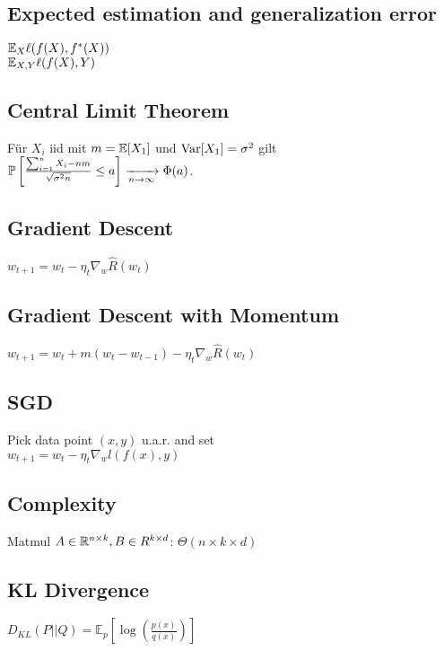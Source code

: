 \subsection*{Expected estimation and generalization error}
$\E_{X}\ell(f(X), f^\ast(X))$ \\ 
$\E_{X,Y}\ell(f(X), Y)$

\subsection*{Central Limit Theorem}

Für $X_i$ iid mit $m = \E[X_1]$ und $\Var[X_1] = \sigma^2$ gilt $\P\left[\frac{\sum_{i=1}^n X_i - n m}{\sqrt{\sigma^2 n}} \leq a\right] \xrightarrow[n \to \infty]{} \Phi(a)$.

\subsection*{Gradient Descent}
$w_{t+1} = w_t - \eta_t \nabla_w \hat{R}(w_t)$
\subsection*{Gradient Descent with Momentum} $w_{t+1}=w_t+m(w_t-w_{t-1})-\eta_t \nabla_w \hat{R}(w_t)$
\subsection*{SGD}
Pick data point $(x,y)$ u.a.r. and	set\\  $w_{t+1} = w_t - \eta_t \nabla_w l(f(x),y)$
\subsection*{Complexity}
Matmul $A\in\R^{n\times k},B\in R^{k\times d}$: $\Theta(n\times k\times d)$

\subsection*{KL Divergence}
$D_{KL}(P||Q) = \mathbb{E}_p[\log(\frac{p(x)}{q(x)})]$
\\
